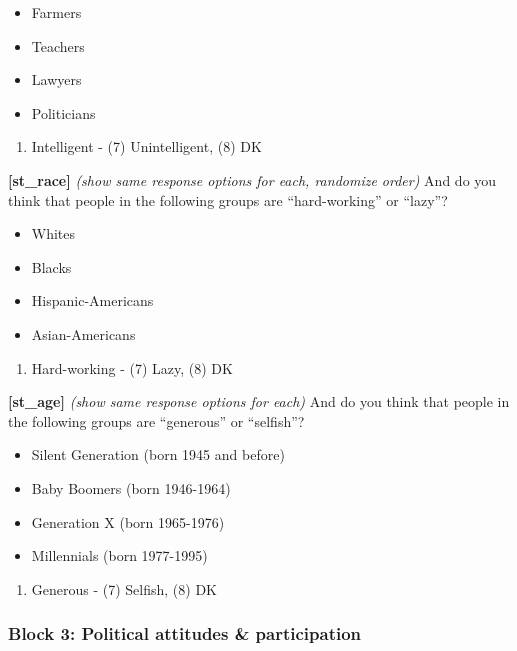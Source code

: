 \documentclass[]{article}
\providecommand{\tightlist}{%
  \setlength{\itemsep}{0pt}\setlength{\parskip}{0pt}}
\begin{document}
\begin{itemize}
\tightlist
\item
  Farmers
\item
  Teachers
\item
  Lawyers
\item
  Politicians
\end{itemize}

\begin{enumerate}
\def\labelenumi{(\arabic{enumi})}
\tightlist
\item
  Intelligent - (7) Unintelligent, (8) DK
\end{enumerate}

\textbf{{[}st\_race{]}} \emph{(show same response options for each,
randomize order)} And do you think that people in the following groups
are ``hard-working'' or ``lazy''?

\begin{itemize}
\tightlist
\item
  Whites
\item
  Blacks
\item
  Hispanic-Americans
\item
  Asian-Americans
\end{itemize}

\begin{enumerate}
\def\labelenumi{(\arabic{enumi})}
\tightlist
\item
  Hard-working - (7) Lazy, (8) DK
\end{enumerate}

\textbf{{[}st\_age{]}} \emph{(show same response options for each)} And
do you think that people in the following groups are ``generous'' or
``selfish''?

\begin{itemize}
\tightlist
\item
  Silent Generation (born 1945 and before)
\item
  Baby Boomers (born 1946-1964)
\item
  Generation X (born 1965-1976)
\item
  Millennials (born 1977-1995)
\end{itemize}

\begin{enumerate}
\def\labelenumi{(\arabic{enumi})}
\tightlist
\item
  Generous - (7) Selfish, (8) DK
\end{enumerate}

\hypertarget{block-3-political-attitudes-participation}{%
\subsubsection{Block 3: Political attitudes \&
participation}\label{block-3-political-attitudes-participation}}
\end{document}
